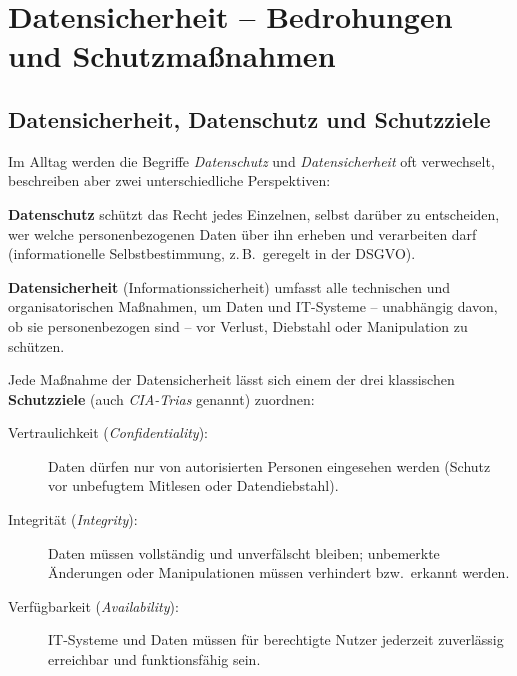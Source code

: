 \chapter{Datensicherheit -- Bedrohungen und Schutzmaßnahmen \tagGKWahl}
\renewcommand{\chaptertitle}{Datensicherheit -- Bedrohungen und Schutzmaßnahmen}

\lehead[]{\normalfont\sffamily\hspace*{-2.00cm}\textcolor{white}{\colorbox{lightblue}{\makebox[1.60cm][r]{\thechapter}}}\hspace{0.17cm}\textcolor{lightblue}{\chaptertitle}}
\rohead[]{\textcolor{lightblue}{\chaptertitle}\normalfont\sffamily\hspace*{0.17cm}\textcolor{white}{\colorbox{lightblue}{\makebox[1.60cm][l]{\thechapter}}}\hspace{-2.00cm}}
\rehead[]{\textcolor{lightblue}{AvHG, Inf, My}}
\lohead[]{\textcolor{lightblue}{AvHG, Inf, My}}

\section{Datensicherheit, Datenschutz und Schutzziele}

Im Alltag werden die Begriffe \emph{Datenschutz} und \emph{Datensicherheit} oft
verwechselt, beschreiben aber zwei unterschiedliche Perspektiven:

\begin{compactitem}
\item \textbf{Datenschutz} schützt das Recht jedes Einzelnen, selbst darüber
zu entscheiden, wer welche personenbezogenen Daten über ihn erheben und
verarbeiten darf (informationelle Selbstbestimmung, z.\,B.\ geregelt in der
DSGVO).
\item \textbf{Datensicherheit} (Informationssicherheit) umfasst alle
technischen und organisatorischen Maßnahmen, um Daten und IT-Systeme --
unabhängig davon, ob sie personenbezogen sind -- vor Verlust, Diebstahl oder
Manipulation zu schützen.
\end{compactitem}

Jede Maßnahme der Datensicherheit lässt sich einem der drei klassischen
\textbf{Schutzziele} (auch \emph{CIA-Trias} genannt) zuordnen:

\begin{description}
\item[Vertraulichkeit (\emph{Confidentiality}):] Daten dürfen nur von
autorisierten Personen eingesehen werden (Schutz vor unbefugtem Mitlesen oder
Datendiebstahl).
\item[Integrität (\emph{Integrity}):] Daten müssen vollständig und unverfälscht
bleiben; unbemerkte Änderungen oder Manipulationen müssen verhindert bzw.\
erkannt werden.
\item[Verfügbarkeit (\emph{Availability}):] IT-Systeme und Daten müssen für
berechtigte Nutzer jederzeit zuverlässig erreichbar und funktionsfähig sein.
\end{description}


